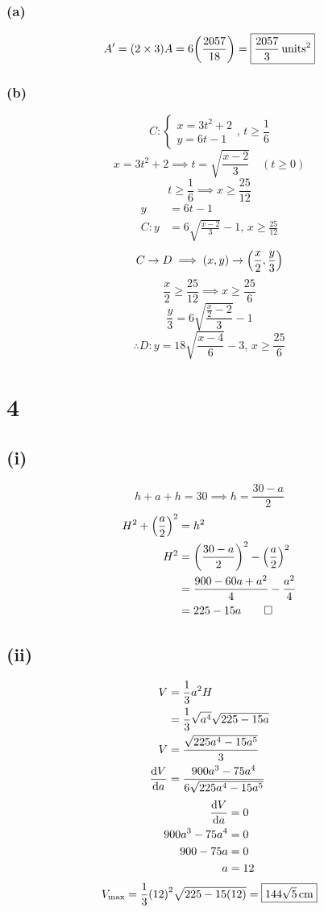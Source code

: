 \documentclass[a4paper,12pt]{article}
\begin{document}
\subsubsection*{(a)}
\[A^\prime=(2\times3)A=6\pqty{\frac{2057}{18}}=\boxed{\frac{2057}3\,\text{units}^2}\]
\subsubsection*{(b)}
\[C:\begin{cases}
    x=3t^2+2\\
    y=6t-1
\end{cases}
,\,t\geqslant\frac16\]
\[x=3t^2+2\implies t=\sqrt{\frac{x-2}3}\quad(t\geqslant0)\]
\[t\geqslant\frac16\implies x\geqslant\frac{25}{12}\]
\[\begin{aligned}
    y&=6t-1\\
    C:y&=6\sqrt{\frac{x-2}3}-1,\,x\geqslant\frac{25}{12}
\end{aligned}\]
\[C\to D\implies (x,y)\to\pqty{\frac x2,\frac y3}\]
\[\frac x2\geqslant\frac{25}{12}\implies x\geqslant\frac{25}6\]
\[\frac y3=6\sqrt{\frac{\frac x2-2}3}-1\]
\[\therefore D:\boxed{y=18\sqrt{\frac{x-4}6}-3,\,x\geqslant\frac{25}6}\]

\section*{4}
\subsection*{(i)}
\[h+a+h=30\implies h=\frac{30-a}2\]
\[\begin{aligned}
    H^2+\pqty{\frac a2}^2&=h^2\\
    H^2&=\pqty{\frac{30-a}2}^2-\pqty{\frac a2}^2\\
       &=\frac{900-60a+a^2}4-\frac{a^2}4\\
       &=225-15a\qed
\end{aligned}\]
\subsection*{(ii)}
\[\begin{aligned}
    V&=\frac13a^2H\\
     &=\frac13\sqrt{a^4}\sqrt{225-15a}\\
    V&=\frac{\sqrt{225a^4-15a^5}}3\\
    \dv{V}{a}&=\frac{900a^3-75a^4}{6\sqrt{225a^4-15a^5}}\\
\end{aligned}\]
\[\begin{aligned}
    \dv{V}{a}&=0\\
    900a^3-75a^4&=0\\
    900-75a&=0\\
    a&=12
\end{aligned}\]
\[V_{\max}=\frac13\pqty{12}^2\sqrt{225-15(12)}=\boxed{144\sqrt5\,\text{cm}}\]
\end{document}
